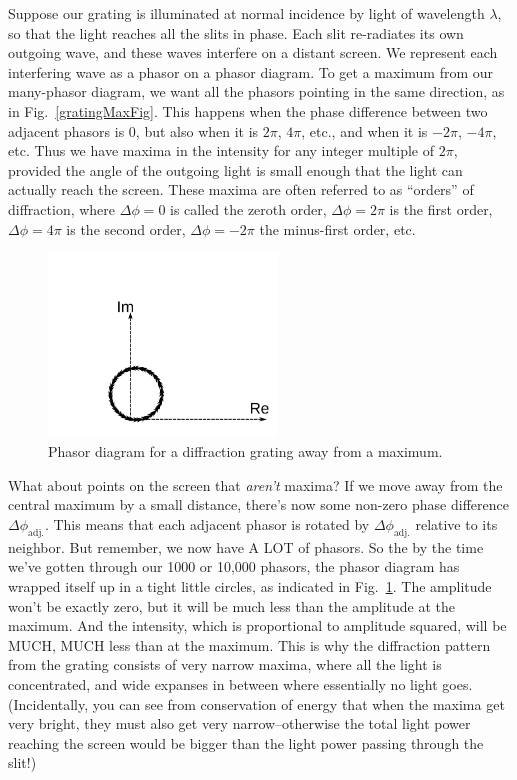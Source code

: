 Suppose our grating is illuminated at normal incidence by light of
wavelength $\lambda$, so that the light reaches all the slits in
phase.  Each slit re-radiates its own outgoing wave, and these waves
interfere on a distant screen. We represent each interfering wave as
a phasor on a phasor diagram.  To get a maximum from our many-phasor
diagram, we want all the phasors pointing in the same direction, as
in Fig.~\ref{gratingMaxFig}.  This happens when the phase difference
between two adjacent phasors is $0$, but also when it is $2\pi$, $4\pi$,
etc., and when it is $-2\pi$, $-4\pi$, etc.  Thus we have maxima in the
intensity for any integer multiple of $2\pi$, provided the angle of the
outgoing light is small enough that the light can actually reach the
screen. These maxima are often referred to as ``orders'' of diffraction,
where $\Delta\phi=0$ is called the zeroth order, $\Delta\phi=2\pi$ is the
first order, $\Delta\phi = 4\pi$ is the second order, $\Delta\phi=-2\pi$
the minus-first order, etc.

\begin{figure}[b]
\begin{center}\includegraphics[width=2.4in]{phasors/gratingPhasorNonMax}
\end{center}
\caption{\label{gratingNonMaxFig}Phasor diagram for a diffraction grating
away from a maximum.}
\end{figure}

What about points on the screen that \emph{aren't} maxima?  If we move
away from  the central maximum by  a small distance,  there's now some
non-zero  phase difference  $\Delta\phi_\text{adj.}$. This  means that
each adjacent  phasor is rotated  by $\Delta\phi_\text{adj.}$ relative
to its neighbor. But remember, we now have A LOT of phasors. So the by
the time we've  gotten through our 1000 or  10,000 phasors, the phasor
diagram  has  wrapped itself  up  in  a tight little  circles,  as
indicated in  Fig.~\ref{gratingNonMaxFig}. The  amplitude won't be  exactly zero,  but it
will  be  much  less  than  the  amplitude at  the  maximum.  And  the
intensity, which  is proportional to amplitude squared,  will be MUCH,
MUCH less  than at the maximum.   This is why  the diffraction pattern
from the grating  consists of very narrow maxima,  where all the light
is  concentrated, and wide  expanses in  between where  essentially no
light goes.   (Incidentally, you can  see from conservation  of energy
that  when  the  maxima get  very  bright,  they  must also  get  very
narrow--otherwise the  total light power reaching the  screen would be
bigger than the light power passing through the slit!)

